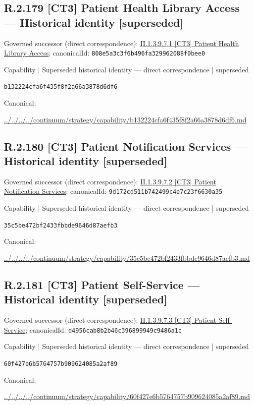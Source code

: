 \documentclass[10pt,a4paper]{article}
\begin{document}
\subsection*{R.2.179 [CT3] Patient Health Library Access — Historical identity [superseded]}
Governed successor (direct correspondence): \hyperref[element-808e5a3c3f6b496fa329962088f0bee0]{II.1.3.9.7.1 [CT3] Patient Health Library Access}; canonicalId: \texttt{808e5a3c3f6b496fa329962088f0bee0}\par
\label{element-b132224cfa6f435f8f2a66a3878d6df6}
{\small Capability | Superseded historical identity — direct correspondence | superseded}\par
\texttt{b132224cfa6f435f8f2a66a3878d6df6}\par
Canonical: \par
{\footnotesize\url{../../../../continuum/strategy/capability/b132224cfa6f435f8f2a66a3878d6df6.md}}\par
\subsection*{R.2.180 [CT3] Patient Notification Services — Historical identity [superseded]}
Governed successor (direct correspondence): \hyperref[element-9d172cd511b742499c4e7c23f6630a35]{II.1.3.9.7.2 [CT3] Patient Notification Services}; canonicalId: \texttt{9d172cd511b742499c4e7c23f6630a35}\par
\label{element-35c5be472bf2433fbbde9646d87aefb3}
{\small Capability | Superseded historical identity — direct correspondence | superseded}\par
\texttt{35c5be472bf2433fbbde9646d87aefb3}\par
Canonical: \par
{\footnotesize\url{../../../../continuum/strategy/capability/35c5be472bf2433fbbde9646d87aefb3.md}}\par
\subsection*{R.2.181 [CT3] Patient Self-Service — Historical identity [superseded]}
Governed successor (direct correspondence): \hyperref[element-d4956cab8b2b46c396899949c9486a1c]{II.1.3.9.7.3 [CT3] Patient Self-Service}; canonicalId: \texttt{d4956cab8b2b46c396899949c9486a1c}\par
\label{element-60f427e6b5764757b909624085a2af89}
{\small Capability | Superseded historical identity — direct correspondence | superseded}\par
\texttt{60f427e6b5764757b909624085a2af89}\par
Canonical: \par
{\footnotesize\url{../../../../continuum/strategy/capability/60f427e6b5764757b909624085a2af89.md}}\par
\end{document}

